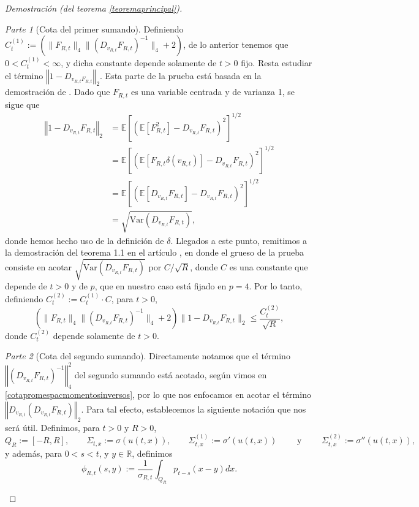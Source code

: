 \documentclass[letterpaper,twoside,12pt]{book}
\newcommand{\R}{\mathbb{R}}
\newcommand{\E}{\mathbb{E}}
\newcommand{\1}{\mathds{1}}
\newcommand{\norm}[1]{\left\Vert #1 \right\Vert}
\theoremstyle{definition}
\theoremstyle{definition}
\theoremstyle{remark}
\newtheorem{proofpart}{Parte}
\theoremstyle{definition}
\theoremstyle{definition}
\theoremstyle{definition}
\theoremstyle{definition}
\theoremstyle{definition}
\begin{document}
\begin{proof}[Demostración (del teorema \ref{teoremaprincipal})]
\begin{proofpart}[Cota del primer sumando]
Definiendo $C_{t}^{(1)}:=\left(\|F_{R,t}\|_4\|\left(D_{v_{R,t}}F_{R,t}\right)^{-1}\|_4+2\right)$, de lo anterior tenemos que $0<C_{t}^{(1)}<\infty$, y dicha constante depende solamente de $t>0$ fijo. Resta estudiar el término $\norm{1-D_{v_{R,t}F_{R,t}}}_2$. Esta parte de la prueba está basada en la demostración de \cite[teorema 1.1]{HUANG20207170}. Dado que $F_{R,t}$ es una variable centrada y de varianza 1, se sigue que 
\begin{align*}
   \norm{1-D_{v_{R,t}}F_{R,t}}_2&=\E\left[(\E\left[F_{R,t}^2\right]-D_{v_{R,t}}F_{R,t})^2\right]^{1/2}\\
   &=\E\left[(\E\left[F_{R,t}\delta(v_{R,t})\right]-D_{v_{R,t}}F_{R,t})^2\right]^{1/2}\\
   &=\E\left[(\E\left[D_{v_{R,t}}F_{R,t}\right]-D_{v_{R,t}}F_{R,t})^2\right]^{1/2}\\
   &=\sqrt{\text{Var}\left(D_{v_{R,t}}F_{R,t}\right)},
\end{align*}
donde hemos hecho uso de la definición de $\delta$. Llegados a este punto, remitimos a la demostración del teorema 1.1 en el artículo \cite{HUANG20207170}, en donde el grueso de la prueba consiste en acotar $\sqrt{\text{Var}\left(D_{v_{R,t}}F_{R,t}\right)}$ por $C/\sqrt{R}$, donde $C$ es una constante que depende de $t>0$ y de $p$, que en nuestro caso está fijado en $p=4$. Por lo tanto, definiendo $C_{t}^{(2)}:=C_{t}^{(1)}\cdot C$, para $t>0$,
\begin{equation}\label{cotaprimersumando}
   \left(\|F_{R,t}\|_4\|\left(D_{v_{R,t}}F_{R,t}\right)^{-1}\|_4+2\right)\|1-D_{v_{R,t}}F_{R,t}\|_2\leq \frac{C_{t}^{(2)}}{\sqrt{R}},
\end{equation}
donde $C_{t}^{(2)}$ depende solamente de $t>0$.
\end{proofpart}
\begin{proofpart}[Cota del segundo sumando]
Directamente notamos que el término $\norm{(D_{v_{R,t}}F_{R,t})^{-1}}^2_4$ del segundo sumando está acotado, según vimos en \eqref{cotapromespacmomentosinversos}, por lo que nos enfocamos en acotar el término $\norm{D_{v_{R,t}}(D_{v_{R,t}}F_{R,t})}_2$. 
Para tal efecto, establecemos la siguiente notación que nos será útil. Definimos, para $t>0$ y $R>0$, 
\[
Q_R:=[-R,R], \qquad \Sigma_{t,x}:=\sigma(u(t,x)), \qquad \Sigma_{t,x}^{(1)}:=\sigma'(u(t,x)) \qquad \text{ y } \qquad \Sigma_{t,x}^{(2)}:=\sigma''(u(t,x)),
\]
y además, para $0<s<t$, y $y\in \R$, definimos  
\begin{equation}\label{defnotacionphi}
   \phi_{R,t}(s,y):=\frac{1}{\sigma_{R,t}}\int_{Q_R}p_{t-s}(x-y)dx.
\end{equation}


\end{proofpart}
\end{proof}
\end{document}
